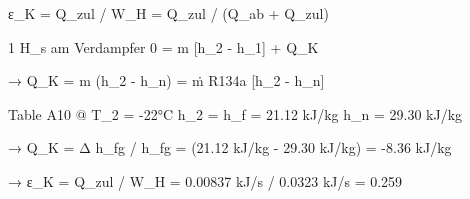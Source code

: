 ε_K = Q_zul / W_H = Q_zul / (Q_ab + Q_zul)  

1 H_s am Verdampfer  
0 = m [h_2 - h_1] + Q_K  

→ Q_K = m (h_2 - h_n) = ṁ R134a [h_2 - h_n]  

Table A10 @ T_2 = -22°C  
h_2 = h_f = 21.12 kJ/kg  
h_n = 29.30 kJ/kg  

→ Q_K = Δ h_fg / h_fg = (21.12 kJ/kg - 29.30 kJ/kg) = -8.36 kJ/kg  

→ ε_K = Q_zul / W_H = 0.00837 kJ/s / 0.0323 kJ/s = 0.259